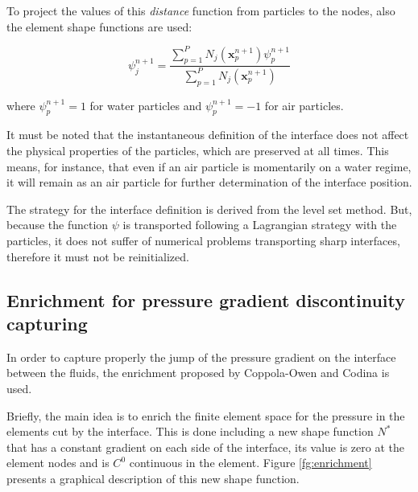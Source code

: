 \documentclass[a4paper,conference]{IEEEtran}
\newcommand{\xx}{\mathbf{x}}
\begin{document}
    To project the values of this \textit{distance} function from particles to the nodes, also the element shape functions are used:
    
    \begin{equation}
      {\psi}_j^{n+1} = \dfrac{\sum_{p=1}^P N_j(\xx_p^{n+1}) {\psi}_p^{n+1} }{\sum_{p=1}^P N_j(\xx_p^{n+1})}
    \end{equation}
    
    where ${\psi}_p^{n+1} = 1$ for water particles and  ${\psi}_p^{n+1} = -1$ for air particles.
    
    It must be noted that the instantaneous definition of the interface does not affect the physical properties of the particles, which are preserved at all times. This means, for instance, that even if an air particle is momentarily on a water regime, it will remain as an air particle for further determination of the interface position. 
    
    The strategy for the interface definition is derived from the level set method. But, because the function $\psi$ is transported following a Lagrangian strategy with the particles, it does not suffer of numerical problems transporting sharp interfaces, therefore it must not be reinitialized.

\subsection{Enrichment for pressure gradient discontinuity capturing}

  In order to capture properly the jump of the pressure gradient on the interface between the fluids, the enrichment proposed by Coppola-Owen and Codina\cite{Coppola05} is used.

  Briefly, the main idea is to enrich the finite element space for the pressure in the elements cut by the interface. This is done including a new shape function $N^*$ that has a constant gradient on each side of the interface, its value is zero at the element nodes and is $C^0$ continuous in the element. Figure \ref{fg:enrichment} presents a graphical description of this new shape function.
  
\end{document}
